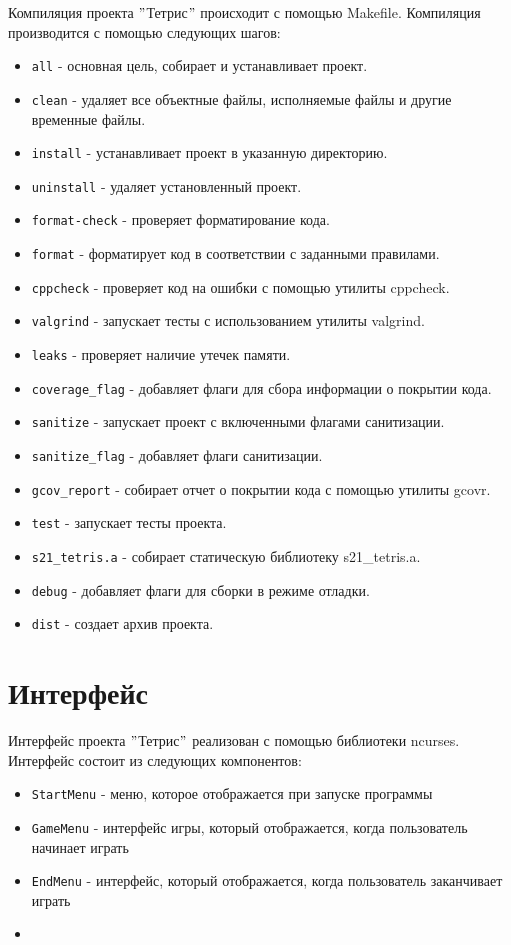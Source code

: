 \documentclass[a4paper,12pt]{article}
\begin{document}
Компиляция проекта \("\)Тетрис\("\) происходит с помощью Makefile. Компиляция производится с помощью следующих шагов:
\begin{itemize}
    \item \texttt{all} - основная цель, собирает и устанавливает проект.
    \item \texttt{clean} - удаляет все объектные файлы, исполняемые файлы и другие временные файлы.
    \item \texttt{install} - устанавливает проект в указанную директорию.
    \item \texttt{uninstall} - удаляет установленный проект.
    \item \texttt{format-check} - проверяет форматирование кода.
    \item \texttt{format} - форматирует код в соответствии с заданными правилами.
    \item \texttt{cppcheck} - проверяет код на ошибки с помощью утилиты cppcheck.
    \item \texttt{valgrind} - запускает тесты с использованием утилиты valgrind.
    \item \texttt{leaks} - проверяет наличие утечек памяти.
    \item \texttt{coverage\_flag} - добавляет флаги для сбора информации о покрытии кода.
    \item \texttt{sanitize} - запускает проект с включенными флагами санитизации.
    \item \texttt{sanitize\_flag} - добавляет флаги санитизации.
    \item \texttt{gcov\_report} - собирает отчет о покрытии кода с помощью утилиты gcovr.
    \item \texttt{test} - запускает тесты проекта.
    \item \texttt{s21\_tetris.a} - собирает статическую библиотеку s21\_tetris.a.
    \item \texttt{debug} - добавляет флаги для сборки в режиме отладки.
    \item \texttt{dist} - создает архив проекта.
\end{itemize}

\section{Интерфейс}
Интерфейс проекта \("\)Тетрис\("\) реализован с помощью библиотеки ncurses. Интерфейс состоит из следующих компонентов:
\begin{itemize}
\item \texttt{StartMenu} - меню, которое отображается при запуске программы
\item \texttt{GameMenu} - интерфейс игры, который отображается, когда пользователь начинает играть
\item \texttt{EndMenu} - интерфейс, который отображается, когда пользователь заканчивает играть
\item \end{itemize}
\end{document}
